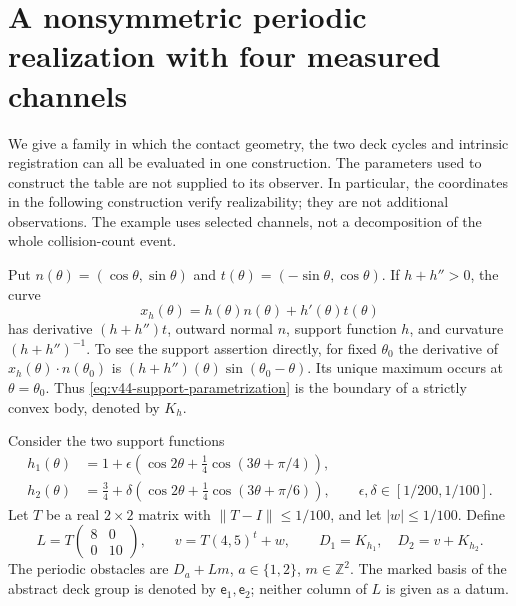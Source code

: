 \section{A nonsymmetric periodic realization with four measured channels}
\label{sec:v44-realization}

We give a family in which the contact geometry, the two deck cycles and
intrinsic registration can all be evaluated in one construction.  The
parameters used to construct the table are not supplied to its observer.
In particular, the coordinates in the following construction verify
realizability; they are not additional observations.  The example uses
selected channels, not a decomposition of the whole collision-count event.

Put $n(\theta)=(\cos\theta,\sin\theta)$ and
$t(\theta)=(-\sin\theta,\cos\theta)$.  If $h+h''>0$, the curve
\begin{equation}\label{eq:v44-support-parametrization}
 x_h(\theta)=h(\theta)n(\theta)+h'(\theta)t(\theta)
\end{equation}
has derivative $(h+h'')t$, outward normal $n$, support function $h$,
and curvature $(h+h'')^{-1}$.  To see the support assertion directly,
for fixed $\theta_0$ the derivative of
$x_h(\theta)\cdot n(\theta_0)$ is
$(h+h'')(\theta)\sin(\theta_0-\theta)$.  Its unique maximum occurs at
$\theta=\theta_0$.  Thus \eqref{eq:v44-support-parametrization} is the
boundary of a strictly convex body, denoted by $K_h$.

Consider the two support functions
\begin{equation}\label{eq:v44-supports}
 \begin{split}
 h_1(\theta)&=1+\epsilon\left(\cos2\theta+
                  \tfrac14\cos(3\theta+\pi/4)\right),\\
 h_2(\theta)&=\tfrac34+\delta\left(\cos2\theta+
                  \tfrac14\cos(3\theta+\pi/6)\right),
 \qquad \epsilon,\delta\in[1/200,1/100].
 \end{split}
\end{equation}
Let $T$ be a real $2\times2$ matrix with $\|T-I\|\le1/100$, and let
$|w|\le1/100$.  Define
\begin{equation}\label{eq:v44-lattice-family}
 L=T\begin{pmatrix}8&0\\0&10\end{pmatrix},\qquad
 v=T(4,5)^t+w,\qquad
 D_1=K_{h_1},\quad D_2=v+K_{h_2}.
\end{equation}
The periodic obstacles are $D_a+L m$, $a\in\{1,2\}$, $m\in\mathbb Z^2$.
The marked basis of the abstract deck group is denoted by
$\mathsf e_1,\mathsf e_2$; neither column of $L$ is given as a datum.

